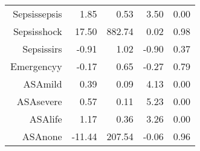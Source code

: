 \begin{tabular}{rrrrr}
$$  Sepsis\-sepsis & 1.85 & 0.53 & 3.50 & 0.00 \\ 
  Sepsis\-shock & 17.50 & 882.74 & 0.02 & 0.98 \\ 
  Sepsis\-sirs & -0.91 & 1.02 & -0.90 & 0.37 \\ 
  Emergency\-y & -0.17 & 0.65 & -0.27 & 0.79 \\ 
  ASA\-mild & 0.39 & 0.09 & 4.13 & 0.00 \\ 
  ASA\-severe & 0.57 & 0.11 & 5.23 & 0.00 \\ 
  ASA\-life & 1.17 & 0.36 & 3.26 & 0.00 \\ 
  ASA\-none & -11.44 & 207.54 & -0.06 & 0.96 \\ 
   \hline
\end{tabular}

\bigskip\bigskip
\centering
